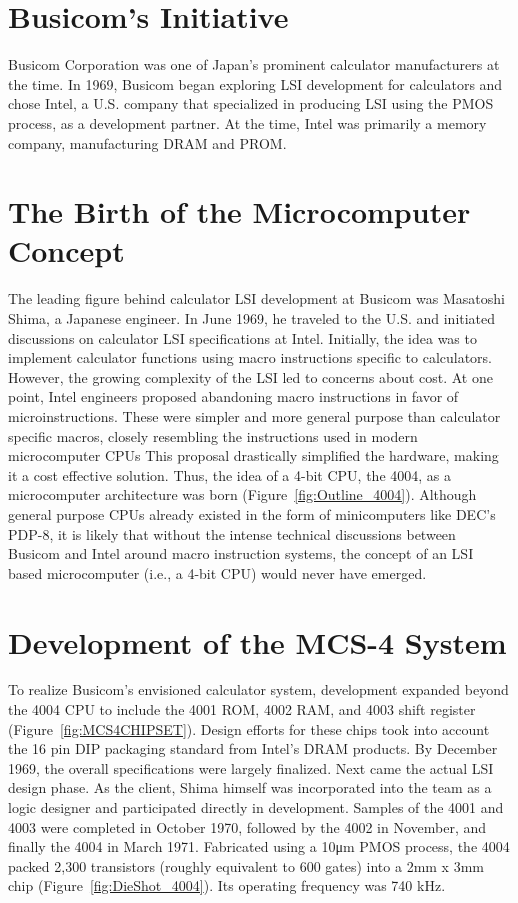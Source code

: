 \section{Busicom's Initiative}
Busicom Corporation was one of Japan's prominent calculator manufacturers at the time. In 1969, Busicom began exploring LSI development for calculators and chose Intel, a U.S. company that specialized in producing LSI using the PMOS process, as a development partner. At the time, Intel was primarily a memory company, manufacturing DRAM and PROM.

\section{The Birth of the Microcomputer Concept}
The leading figure behind calculator LSI development at Busicom was Masatoshi Shima, a Japanese engineer. In June 1969, he traveled to the U.S. and initiated discussions on calculator LSI specifications at Intel. Initially, the idea was to implement calculator functions using macro instructions specific to calculators. However, the growing complexity of the LSI led to concerns about cost. At one point, Intel engineers proposed abandoning macro instructions in favor of microinstructions. These were simpler and more general purpose than calculator specific macros, closely resembling the instructions used in modern microcomputer CPUs This proposal drastically simplified the hardware, making it a cost effective solution. Thus, the idea of a 4-bit CPU, the 4004, as a microcomputer architecture was born (Figure~\ref{fig:Outline_4004}). Although general purpose CPUs already existed in the form of minicomputers like DEC's PDP-8, it is likely that without the intense technical discussions between Busicom and Intel around macro instruction systems, the concept of an LSI based microcomputer (i.e., a 4-bit CPU) would never have emerged.

\section{Development of the MCS-4 System}
To realize Busicom's envisioned calculator system, development expanded beyond the 4004 CPU to include the 4001 ROM, 4002 RAM, and 4003 shift register (Figure~\ref{fig:MCS4CHIPSET}). Design efforts for these chips took into account the 16 pin DIP packaging standard from Intel's DRAM products. By December 1969, the overall specifications were largely finalized. Next came the actual LSI design phase. As the client, Shima himself was incorporated into the team as a logic designer and participated directly in development. Samples of the 4001 and 4003 were completed in October 1970, followed by the 4002 in November, and finally the 4004 in March 1971. Fabricated using a 10μm PMOS process, the 4004 packed 2,300 transistors (roughly equivalent to 600 gates) into a 2mm x 3mm chip (Figure~\ref{fig:DieShot_4004}). Its operating frequency was 740 kHz.

